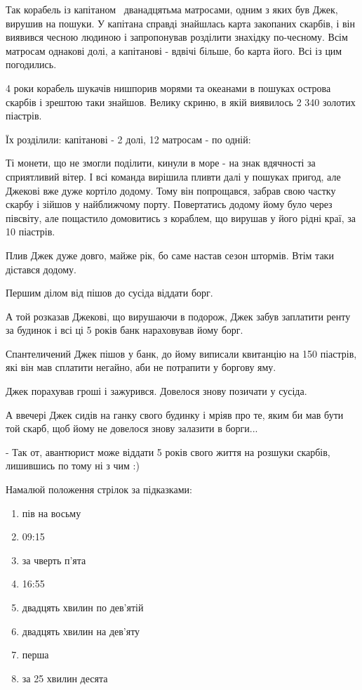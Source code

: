 Так корабель із капітаном  дванадцятьма матросами, одним з яких був Джек,
вирушив на пошуки. У капітана справді знайшлась карта закопаних скарбів,
і він виявився чесною людиною і запропонував розділити знахідку по-чесному.
Всім матросам однакові долі, а капітанові - вдвічі більше, бо карта його.
Всі із цим погодились.

4 роки корабель шукачів нишпорив морями та океанами в пошуках острова
скарбів і зрештою таки знайшов. Велику скриню, в якій виявилось
2 340 золотих піастрів.

Їх розділили: капітанові - 2 долі, 12 матросам - по одній:

Ті монети, що не змогли поділити, кинули в море - на знак вдячності
за сприятливий вітер. І всі команда вирішила пливти далі у пошуках пригод,
але Джекові вже дуже кортіло додому. Тому він попрощався, забрав свою
частку скарбу і зійшов у найближчому порту. Повертатись додому йому було
через півсвіту, але пощастило домовитись з кораблем, що вирушав у його
рідні краї, за 10 піастрів.

Плив Джек дуже довго, майже рік, бо саме настав сезон штормів.
Втім таки дістався додому.

Першим ділом від пішов до сусіда віддати борг.

А той розказав Джекові, що вирушаючи в подорож, Джек забув заплатити
ренту за будинок і всі ці 5 років банк нараховував йому борг.

Спантеличений Джек пішов у банк, до йому виписали квитанцію на 150 піастрів,
які він мав сплатити негайно, аби не потрапити у боргову яму.

Джек порахував гроші і зажурився. Довелося знову позичати у сусіда.

А ввечері Джек сидів на ганку свого будинку і мріяв про те,
яким би мав бути той скарб, щоб йому не довелося знову залазити в борги...

- Так от, авантюрист може віддати 5 років свого життя на розшуки скарбів,
лишившись по тому ні з чим :)


\problem
Намалюй положення стрілок за підказками:
\begin{enumerate}
    \item пів на восьму
    \item 09:15
    \item за чверть п’ята
    \item 16:55
    \item двадцять хвилин по дев’ятій
    \item двадцять хвилин на дев’яту
    \item перша
    \item за 25 хвилин десята
\end{enumerate}



